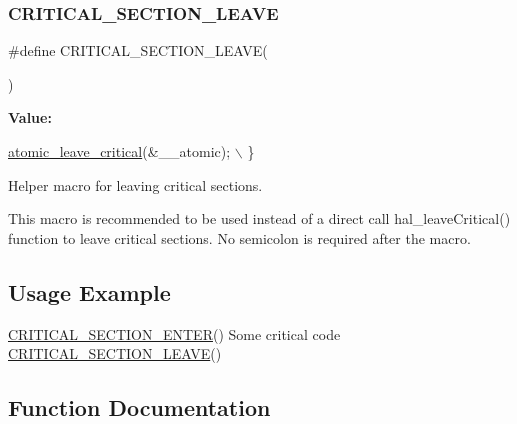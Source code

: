 \subsubsection{\texorpdfstring{C\+R\+I\+T\+I\+C\+A\+L\+\_\+\+S\+E\+C\+T\+I\+O\+N\+\_\+\+L\+E\+A\+VE}{CRITICAL\_SECTION\_LEAVE}}
{\footnotesize\ttfamily \#define C\+R\+I\+T\+I\+C\+A\+L\+\_\+\+S\+E\+C\+T\+I\+O\+N\+\_\+\+L\+E\+A\+VE(\begin{DoxyParamCaption}{ }\end{DoxyParamCaption})}

{\bfseries Value\+:}
\begin{DoxyCode}
\hyperlink{group__doc__driver__hal__helper__atomic_gaef0ccaa2438aca5ea074b36252d65990}{atomic\_leave\_critical}(&\_\_atomic);                                                     
                                   \(\backslash\)
    \}
\end{DoxyCode}


Helper macro for leaving critical sections. 

This macro is recommended to be used instead of a direct call hal\+\_\+leave\+Critical() function to leave critical sections. No semicolon is required after the macro.\hypertarget{group__doc__driver__hal__helper__atomic_atomic_usage}{}\subsection{Usage Example}\label{group__doc__driver__hal__helper__atomic_atomic_usage}

\begin{DoxyCode}
\hyperlink{group__doc__driver__hal__helper__atomic_ga039bfe712b6ba4388a35672f54763391}{CRITICAL\_SECTION\_ENTER}()
Some critical code
\hyperlink{group__doc__driver__hal__helper__atomic_ga6b32c9f95e7c6b604d621e215c514015}{CRITICAL\_SECTION\_LEAVE}()
\end{DoxyCode}
 

\subsection{Function Documentation}
\mbox{\label{group__doc__driver__hal__helper__atomic_ga3bd20e6e0bdec53177758490510ba916}} 

